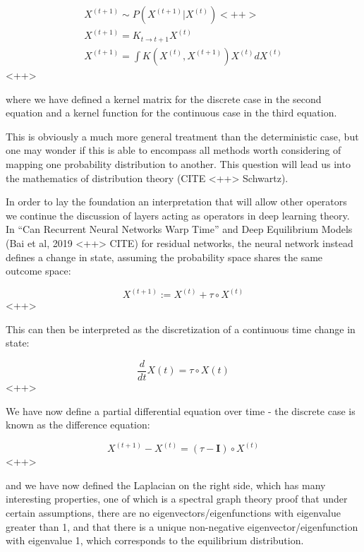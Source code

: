 \documentclass[a4paper]{article}
\begin{document}
\begin{equation}
  \begin{split}
    X^{(t+1)} \sim P \left( X^{(t+1)} \vert X^{(t)} \right)<++> \\
    X^{(t+1)} = K_{t \rightarrow t+1} X^{(t)} \\
    X^{(t+1)} = \int K(X^{(t)},X^{(t+1)}) X^{(t)} dX^{(t)}
  \end{split}
  \label{<++>}
\end{equation}<++>

where we have defined a kernel matrix for the discrete case in the second equation and a kernel function for the continuous case in the third equation.

This is obviously a much more general treatment than the deterministic case, but one may wonder if this is able to encompass all methods worth considering of mapping one probability distribution to another. 
This question will lead us into the mathematics of distribution theory (CITE <++> Schwartz).

In order to lay the foundation an interpretation that will allow other operators we continue the discussion of layers acting as operators in deep learning theory. 
In ``Can Recurrent Neural Networks Warp Time'' and Deep Equilibrium Models (Bai et al, 2019 <++> CITE) for residual networks, the neural network instead defines a change in state, assuming the probability space shares the same outcome space:

\begin{equation}
  X^{(t+1)} := X^{(t)} + \tau \circ X^{(t)}
  \label{<++>}
\end{equation}<++>

This can then be interpreted as the discretization of a continuous time change in state:

\begin{equation}
  \frac{d}{dt} X(t) = \tau \circ X(t)
  \label{<++>}
\end{equation}<++>

We have now define a partial differential equation over time - the discrete case is known as the difference equation:

\begin{equation}
  X^{(t+1)} - X^{(t)} = \left( \tau - \mathbf{I} \right) \circ X^{(t)}
  \label{<++>}
\end{equation}<++>

and we have now defined the Laplacian on the right side, which has many interesting properties, one of which is a spectral graph theory proof that under certain assumptions, there are no eigenvectors/eigenfunctions with eigenvalue greater than 1, and that there is a unique non-negative eigenvector/eigenfunction with eigenvalue 1, which corresponds to the equilibrium distribution. 
\end{document}
